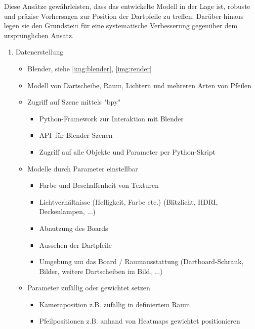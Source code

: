 Diese Ansätze gewährleisten, dass das entwickelte Modell in der Lage ist, robuste und präzise Vorhersagen zur Position der Dartpfeile zu treffen. Darüber hinaus legen sie den Grundstein für eine systematische Verbesserung gegenüber dem ursprünglichen Ansatz.

\iffalse
\begin{enumerate}
    \item Datenerstellung
    \begin{itemize}
        \item Blender, siehe \autoref{img:blender}, \autoref{img:render}
        \item Modell von Dartscheibe, Raum, Lichtern und mehreren Arten von Pfeilen

        \item Zugriff auf Szene mittels "bpy"
        \begin{itemize}
            \item Python-Framework zur Interaktion mit Blender
            \item \glqq API\grqq\, für Blender-Szenen
            \item Zugriff auf alle Objekte und Parameter per Python-Skript
        \end{itemize}

        \item Modelle durch Parameter einstellbar
        \begin{itemize}
            \raggedright
            \item Farbe und Beschaffenheit von Texturen
            \item Lichtverhältnisse (Helligkeit, Farbe etc.) (Blitzlicht, HDRI, Deckenlampen, ...)
            \item Abnutzung des Boards
            \item Aussehen der Dartpfeile
            \item Umgebung um das Board / Raumausstattung (Dartboard-Schrank, Bilder, weitere Dartscheiben im Bild, ...)
        \end{itemize}

        \item Parameter zufällig oder gewichtet setzen
        \begin{itemize}
            \item Kameraposition z.B. zufällig in definiertem Raum
            \item Pfeilpositionen z.B. anhand von Heatmaps gewichtet positionieren
        \end{itemize}


\end{itemize}
\end{enumerate}
